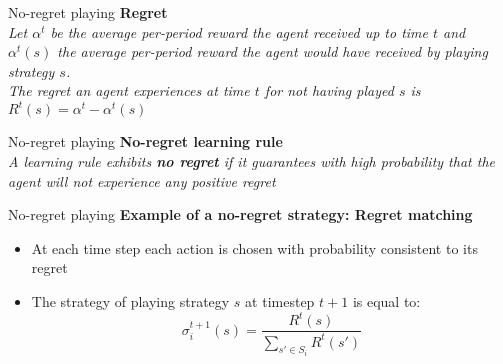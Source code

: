 


\begin{frame}{No-regret playing}
    \textbf{Regret}\\
    \textit{Let $\alpha^t$ be the average per-period reward the agent received up to time $t$ and $\alpha^t(s)$ the average per-period reward the agent would have received by playing strategy $s$.}\\
    \textit{The regret an agent experiences at time $t$ for not having played $s$ is $R^t(s)=\alpha^t-\alpha^t(s)$}
\end{frame}

\begin{frame}{No-regret playing}
    \textbf{No-regret learning rule}\\
    \textit{A learning rule exhibits \textbf{no regret} if it guarantees with high probability that the agent will not experience any positive regret}
\end{frame}

\begin{frame}{No-regret playing}
    \textbf{Example of a no-regret strategy: Regret matching}\\
    \begin{itemize}
        \item At each time step each action is chosen with probability consistent to its regret
        \item The strategy of playing strategy $s$ at timestep $t+1$ is equal to:
        \[
            \sigma_i^{t+1}(s)= \frac{R^t(s)}{\sum_{s'\in S_i} R^t(s')}
        \]
    \end{itemize}
\end{frame}


